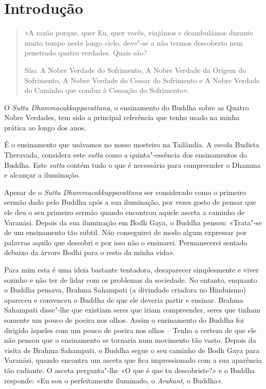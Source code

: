 \chapter{Introdução}

\thispagestyle{bottomcenter}

\begin{quote}
  «A razão porque, quer Eu, quer vocês, viajámos e deambulámos durante muito
  tempo neste longo ciclo, deve"-se a não termos descoberto nem penetrado quatro
  verdades. Quais são?

  São: A Nobre Verdade do Sofrimento, A Nobre Verdade da Origem do Sofrimento, A
  Nobre Verdade do Cessar do Sofrimento e A Nobre Verdade do Caminho que conduz
  à Cessação do Sofrimento».

\end{quote}

\noindent
O \emph{Sutta Dhammacakkappavattana}, o ensinamento do Buddha sobre as Quatro
Nobre Verdades, tem sido a principal referência que tenho usado na minha prática
ao longo dos anos.

\enlargethispage{\baselineskip}

É o ensinamento que usávamos no nosso mosteiro na Tailândia.
A escola Budista Theravada, considera este \emph{sutta} como a quinta"-essência
dos ensinamentos do Buddha. Este \emph{sutta} contém tudo o que é necessário
para compreender o Dhamma e alcançar a iluminação.

Apesar de o \emph{Sutta Dhammacakkappavattana} ser considerado como o primeiro
sermão dado pelo Buddha após a sua iluminação, por vezes gosto de pensar que ele
deu o seu primeiro sermão quando encontrou aquele asceta a caminho de Varanāsi.
Depois da sua iluminação em Bodh Gaya, o Buddha pensou: «Trata"-se de um
ensinamento tão subtil. Não conseguirei de modo algum expressar por palavras
aquilo que descobri e por isso não o ensinarei. Permanecerei sentado debaixo da
árvore Bodhi para o resto da minha vida».

Para mim esta é uma ideia bastante tentadora, desaparecer simplesmente e viver
sozinho e não ter de lidar com os problemas da sociedade. No entanto, enquanto o
Buddha pensava, Brahma Sahampati (a divindade criadora no Hinduísmo) apareceu e
convenceu o Buddha de que ele deveria partir e ensinar. Brahma Sahampati
disse"-lhe que existiam seres que iriam compreender, seres que tinham somente um pouco
de poeira nos olhos. Assim o ensinamento do Buddha foi dirigido àqueles com um
pouco de poeira nos olhos – Tenho a certeza de que ele não pensou que o
ensinamento se tornaria num movimento tão vasto.
Depois da visita de Brahma Sahampati, o Buddha segue o seu caminho de Bodh Gaya
para Varanāsi, quando encontra um asceta que fica impressionado com a sua
aparência tão radiante. O asceta pergunta"-lhe «O que é que tu descobriste?» e o
Buddha responde: «Eu sou o perfeitamente iluminado, o \emph{Arahant}, o Buddha».

